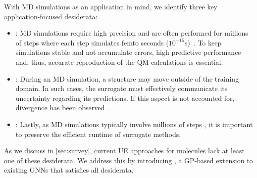 With MD simulations as an application in mind, we identify three key application-focused desiderata:
\begin{itemize}
    \item \desfive{}: MD simulations require high precision and are often performed for millions of steps where each step simulates femto seconds ($10^{-15}\si{\second}$)~\citep{stockerHowRobustAre2022}. To keep simulations stable and not accumulate errors, high predictive performance and, thus, accurate reproduction of the QM calculations is essential.
    \item \dessix{}: During an MD simulation, a structure may move outside of the training domain. In such cases, the surrogate must effectively communicate its uncertainty regarding its predictions. If this aspect is not accounted for, divergence has been observed~\citep{stockerHowRobustAre2022}.
    \item \desseven{}: Lastly, as MD simulations typically involve millions of steps \cite{Narumi1999}, it is important to preserve the efficient runtime of surrogate methods.
\end{itemize}

As we discuss in \autoref{sec:survey}, current UE approaches for molecules lack at least one of these desiderata. We address this by introducing \oursacro{}, a GP-based extension to existing GNNs that satisfies all desiderata.
